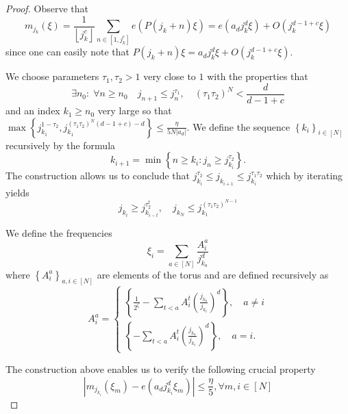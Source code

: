 \documentclass[12pt,leqno]{amsart}
\numberwithin{equation}{section}
\numberwithin{counter2}{section}
\theoremstyle{definition}
\theoremstyle{plain}
\newcommand{\floor}[1]{\left\lfloor #1 \right\rfloor}
\begin{document}
\begin{proof}
		
		Observe that 
		\begin{equation} \label{eq:phase}
			m_{j_k}(\xi) = \frac{1}{\floor{j_k^c}} \sum_{n \in [1,  j_k^c]} e(P(j_k+n)\xi ) = e(a_d j_k^d\xi )+ O \left( j_k^{d-1+c}\xi  \right)
		\end{equation}
		since one can easily note that 	$P(j_k+n)\xi=a_dj_k^d\xi+O\left(j_k^{d-1+c}\xi\right)$. 
		
		We choose parameters $\tau_1,\tau_2>1$ very close to $1$ with the properties that \[\exists n_0: \;\forall n \geq n_0 \quad j_{n+1} \leq  j_{n}^{\tau_1}, \quad (\tau_1 \tau_2)^N< \frac{d}{d-1+c} \] and an index $k_1 \geq n_0$ very large so that $\max \left\{ j_{k_1}^{1-\tau_2},j_{k_1}^{(\tau_1\tau_2)^N(d-1+c)-d}\right\} \leq \frac{\eta}{5N|a_d|} .$  We define the sequence $\left\{k_i\right\}_{i \in [N]}$ recursively by the formula \[ k_{i+1}= \min \left\{ n \geq k_i: j_{n}\geq j_{k_i}^{\tau_2 } \right\}. \]  The construction allows us to conclude that $j_{k_i}^{\tau_2} \leq j_{k_{i+1}} \leq j_{k_i}^{\tau_1\tau_2} $	which by iterating yields \[j_{k_i} \geq j_{k_{i-t}}^{\tau_2^{t}}, \quad j_{k_N} \leq j_{k_1}^{(\tau_1\tau_2)^{N-1}} \]
		
		We define the frequencies \[ \xi_i=\sum_{ a \in [N]}  \frac{A_{i}^a}{j_{k_a}^{d}} \] where $\left\{A_{i}^a\right\}_{a,i \in [N]}$ are elements of the torus and  are defined recursively as \[ A_{i}^a= \left\{\begin{matrix}  \left\{\frac{1}{2^\zeta}-\sum_{t<a} A_{i}^t \left(\frac{j_{k_a}}{j_{k_t}}\right)^d\right\}, \quad a \neq i
			\\  \left\{-\sum_{t<a} A_{i}^t \left(\frac{j_{k_a}}{j_{k_t}}\right)^d\right\}, \quad a =i. 
		\end{matrix}\right.    \] 
		
		The construction above enables us to verify the following crucial  property  \begin{equation} \label{eq:phase2}
			\left| m_{j_{k_i}}(\xi_{m})-e(a_dj_{k_i}^d\xi_{m}) \right| \leq  \frac{\eta}{5}, \forall m,i \in [N]
		\end{equation}
		

\end{proof}
\end{document}

